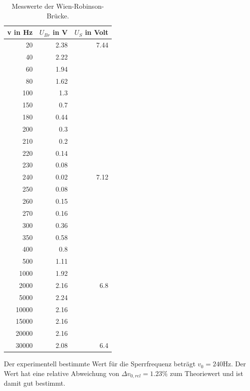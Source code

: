 \begin{table}
  \centering
  \begin{tabular}{r r r}
  \toprule
  v in \si{\hertz} & $U_{Br}$ in \si{\volt} & $U_S$ in Volt \\
  \midrule
  20    &  2.38  &  7.44\\
  40    &  2.22  &      \\
  60    &  1.94  &      \\
  80    &  1.62  &      \\
  100   &  1.3   &      \\
  150   &  0.7   &      \\
  180   &  0.44  &      \\
  200   &  0.3   &      \\
  210   &  0.2   &      \\
  220   &  0.14  &      \\
  230   &  0.08  &      \\
  240   &  0.02  &  7.12\\
  250   &  0.08  &      \\
  260   &  0.15  &      \\
  270   &  0.16  &      \\
  300   &  0.36  &      \\
  350   &  0.58  &      \\
  400   &  0.8   &      \\
  500   &  1.11  &      \\
  1000  &  1.92  &      \\
  2000  &  2.16  &  6.8 \\
  5000  &  2.24  &      \\
  10000 &  2.16  &      \\
  15000 &  2.16  &      \\
  20000 &  2.16  &      \\
  30000 &  2.08  &  6.4 \\
\end{tabular}
\caption{Messwerte der Wien-Robinson-Brücke.}
\label{tab:messwerte6}
\end{table}
Der experimentell bestimmte Wert für die Sperrfrequenz beträgt $v_0 = 240 \si{\hertz}$.
Der Wert hat eine relative Abweichung von $\Delta v_{0,rel} = 1.23 \%$ zum
Theoriewert und ist damit gut bestimmt.
